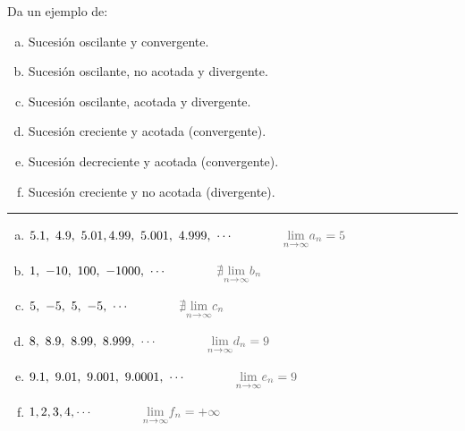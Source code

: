 \begin{miejercicio}

Da un ejemplo de:

\begin{enumerate}[a) ]	
\vspace{-2mm} \item Sucesión oscilante y convergente.
\vspace{-2mm} \item Sucesión oscilante, no acotada y divergente.
\vspace{-2mm} \item	Sucesión oscilante, acotada y divergente.

\vspace{-2mm} \item Sucesión creciente y acotada (convergente).
\vspace{-2mm} \item Sucesión decreciente y acotada (convergente).
\vspace{-2mm} \item Sucesión creciente y no acotada (divergente).
\end{enumerate}

\rule{250pt}{0.1pt}

\begin{enumerate}[a) ]	
\item $5.1,\ 4.9,\ 5.01, 4.99,\ 5.001,\ 4.999,\ \cdots \qquad  \qquad \textcolor{gris}{\underset{n\to \infty}{\mathrm{lim}} a_n=5}$
\item $1,\ -10, \ 100,\ -1000, \ \cdots \qquad  \qquad \textcolor{gris}{\nexists \underset{n\to \infty}{\mathrm{lim}} b_n}$
\item $5,\ -5,\ 5,\ -5,\ \cdots \qquad  \qquad \textcolor{gris}{\nexists \underset{n\to \infty}{\mathrm{lim}} c_n}$
\item $8,\ 8.9,\ 8.99,\ 8.999,\ \cdots \qquad  \qquad \textcolor{gris}{\underset{n\to \infty}{\mathrm{lim}} d_n=9}$
\item $9.1,\ 9.01,\ 9.001,\ 9.0001,\ \cdots \qquad  \qquad \textcolor{gris}{\underset{n\to \infty}{\mathrm{lim}} e_n=9}$
\item $1,2,3,4,\cdots \qquad  \qquad \textcolor{gris}{\underset{n\to \infty}{\mathrm{lim}} f_n=+\infty}$ 
\end{enumerate}
	
\end{miejercicio}

\vspace{1cm}

